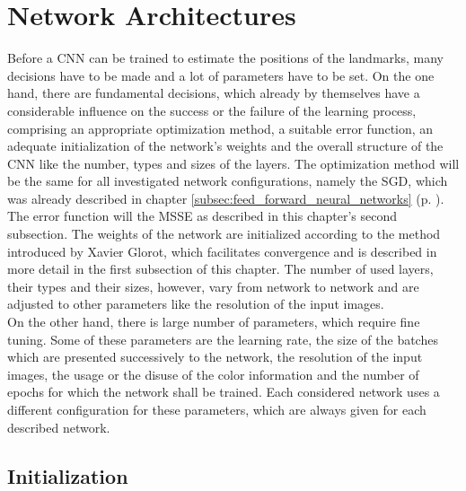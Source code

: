 \documentclass[11pt, a4paper]{article}
\newcommand\myref[1]{\ref{#1} (p. \pageref{#1})}
\begin{document}
\newpage


\section{Network Architectures}
\label{sec:networkarchitectures}

Before a \ac{CNN} can be trained to estimate the positions of the landmarks, many decisions have to be made and a lot of parameters have to be set. On the one hand, there are fundamental decisions, which already by themselves have a considerable influence on the success or the failure of the learning process, comprising an appropriate optimization method, a suitable error function, an adequate initialization of the network's weights and the overall structure of the \ac{CNN} like the number, types and sizes of the layers. The optimization method will be the same for all investigated network configurations, namely the \ac{SGD}, which was already described in chapter \myref{subsec:feed_forward_neural_networks}. The error function will the \ac{MSSE} as described in this chapter's second subsection. The weights of the network are initialized according to the method introduced by Xavier Glorot, which facilitates convergence and is described in more detail in the first subsection of this chapter. The number of used layers, their types and their sizes, however, vary from network to network and are adjusted to other parameters like the resolution of the input images.\\
On the other hand, there is large number of parameters, which require fine tuning. Some of these parameters are the learning rate, the size of the batches which are presented successively to the network, the resolution of the input images, the usage or the disuse of the color information and the number of epochs for which the network shall be trained. Each considered network uses a different configuration for these parameters, which are always given for each described network.

\subsection{Initialization}
\label{subsec:glorot_initialization}
\end{document}
